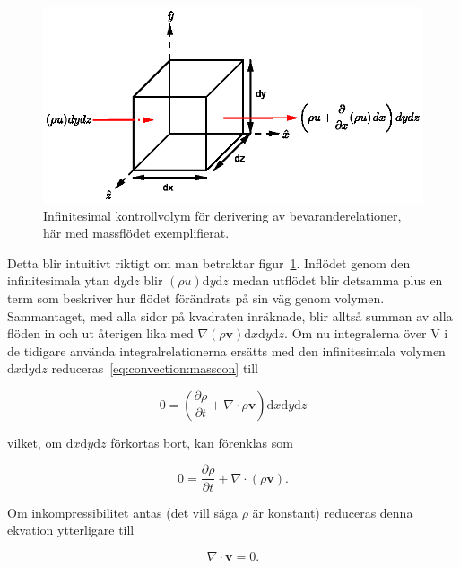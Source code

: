 \begin{figure}[hpbt]\centering
\includegraphics[scale=1]{images/massflowcube.eps}
\caption{Infinitesimal kontrollvolym för derivering av bevaranderelationer, här med massflödet exemplifierat.}
\label{fig:massflowcube}
\end{figure}

Detta blir intuitivt riktigt om man betraktar figur~\ref{fig:massflowcube}. Inflödet genom den infinitesimala ytan $\mathrm{d}y\mathrm{d}z$ blir $\left( \rho u \right) \mathrm{d}y\mathrm{d}z$ medan utflödet blir detsamma plus en term som beskriver hur flödet förändrats på sin väg genom volymen. Sammantaget, med alla sidor på kvadraten inräknade, blir alltså summan av alla flöden in och ut återigen lika med $\nabla \left( \rho \mathbf{v} \right)\mathrm{d}x\mathrm{d}y\mathrm{d}z$. Om nu integralerna över V i de tidigare använda integralrelationerna ersätts med den infinitesimala volymen $\mathrm{d}x\mathrm{d}y\mathrm{d}z$ reduceras~\eqref{eq:convection:masscon} till

\begin{equation}
\label{eq:convection:massconinf}
0 = \left( \frac{\partial \rho}{\partial t} + \nabla \cdot \rho \mathbf{v}\right) \mathrm{d}x\mathrm{d}y\mathrm{d}z
\end{equation}

vilket, om $\mathrm{d}x\mathrm{d}y\mathrm{d}z$ förkortas bort, kan förenklas som

\begin{equation}
\label{eq:convection:continuity}
\boxed{ \; \; \;
0 = \frac{\partial \rho}{\partial t} + \nabla \cdot \left( \rho \mathbf{v} \right).
\; \; \; }
\end{equation}

Om inkompressibilitet antas (det vill säga $\rho$ är konstant) reduceras denna ekvation ytterligare till

\begin{equation}
\label{eq:convection:continuityinc}
\nabla \cdot \mathbf{v} = 0.
\end{equation}

